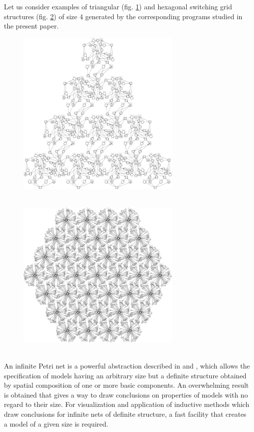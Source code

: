 \documentclass[10pt, a5paper]{article}
\begin{document}
Let us consider examples of triangular (fig. \ref{Shmeleva:fig1}) and  hexagonal switching grid structures (fig. \ref{Shmeleva:fig2}) of size 4 generated by the correspon\-ding programs studied in the present paper.

\begin{center}
\begin{figure}[h!]
  \centering
  \includegraphics[width=8cm]{14_Shmeleva_fig1.png}
  \caption{~}
  \label{Shmeleva:fig1}
\end{figure}
\end{center}

\begin{center}
\begin{figure}[h!]
  \centering
  \includegraphics[width=8cm]{14_Shmeleva_fig2.png}
  \caption{~}
  \label{Shmeleva:fig2}
\end{figure}
\end{center}

An infinite Petri net is a powerful abstraction described in \cite{bib1} and \cite{bib2}, which allows the specification of models having an arbitrary size but a definite structure obtained by spatial composition of one or more basic components. An overwhelming result is obtained that gives a way to draw conclusions on properties of models with no regard to their size. For visualization and application of inductive methods which draw conclusions for infinite nets of definite structure, a fast facility that creates a model of a given size is required.
\end{document}
